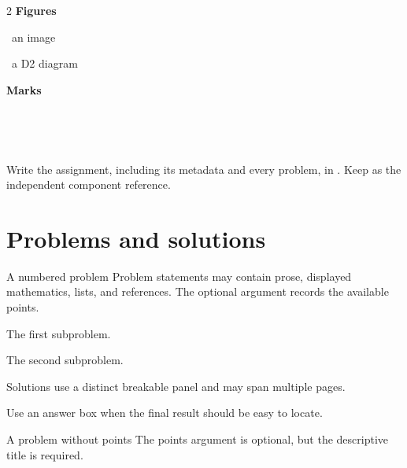 \documentclass[letterpaper,11pt]{article}
\begin{document}
\begin{multicols}{2}
\medskip
\noindent
\textbf{\color{rzaccent}Figures}\par
{} \dotfill\ an image\par
{} \dotfill\ a D2 diagram\par

\medskip
\noindent
\textbf{\color{rzaccent}Marks}\par
\rzcheck\  \quad
\rzcross\ \par
\rzwarnglyph\  \quad
\rzinfoglyph\ \par
\end{multicols}

\begin{callout}
  Write the assignment, including its metadata and every problem, in .
  Keep  as the independent component reference.
\end{callout}

\section{Problems and solutions}

\begin{problem}[12 points]{A numbered problem}
  Problem statements may contain prose, displayed mathematics, lists, and references.
  The optional argument records the available points.
  \begin{subproblems}
    \item The first subproblem.
    \item The second subproblem.
  \end{subproblems}

  \begin{solution}
    Solutions use a distinct breakable panel and may span multiple pages.
  \end{solution}

  \begin{answer}
    Use an answer box when the final result should be easy to locate.
  \end{answer}
\end{problem}

\begin{problem}{A problem without points}
  The points argument is optional, but the descriptive title is required.
\end{problem}
\end{document}
